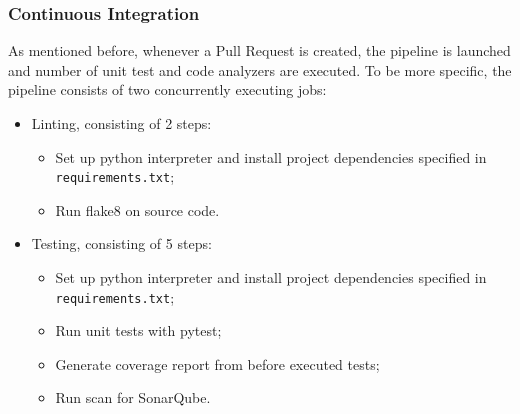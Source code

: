 \documentclass[12pt, fleqn, a4paper]{article}
\begin{document}
\subsubsection{Continuous Integration}
As mentioned before, whenever a Pull Request is created, the pipeline is launched and number of unit test and code analyzers are executed. To be more specific, the pipeline consists of two concurrently executing jobs:
\begin{itemize}
	\item Linting, consisting of 2 steps:
		\begin{itemize}
			\item Set up python interpreter and install project dependencies specified in \verb|requirements.txt|;
			\item Run flake8 on source code.
		\end{itemize}
	\item Testing, consisting of 5 steps:
		\begin{itemize}
			\item Set up python interpreter and install project dependencies specified in \verb|requirements.txt|;
			\item Run unit tests with pytest;
			\item Generate coverage report from before executed tests;
			\item Run scan for SonarQube.
		\end{itemize}
\end{itemize}
\end{document}
